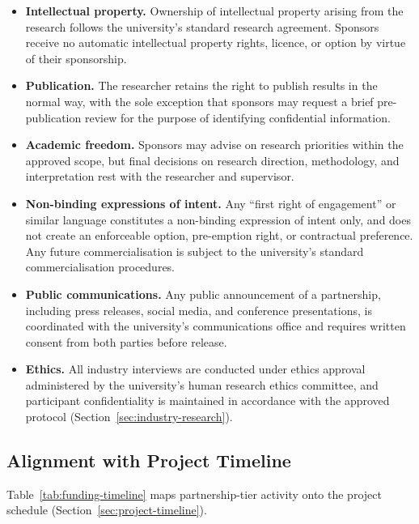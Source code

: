 \documentclass[12pt]{article}
\begin{document}
\begin{itemize}
    \item \textbf{Intellectual property.} Ownership of intellectual
    property arising from the research follows the university's
    standard research agreement. Sponsors receive no automatic
    intellectual property rights, licence, or option by virtue of
    their sponsorship.

    \item \textbf{Publication.} The researcher retains the right to
    publish results in the normal way, with the sole exception that
    sponsors may request a brief pre-publication review for the
    purpose of identifying confidential information.

    \item \textbf{Academic freedom.} Sponsors may advise on research
    priorities within the approved scope, but final decisions on
    research direction, methodology, and interpretation rest with the
    researcher and supervisor.

    \item \textbf{Non-binding expressions of intent.} Any ``first
    right of engagement'' or similar language constitutes a
    non-binding expression of intent only, and does not create an
    enforceable option, pre-emption right, or contractual preference.
    Any future commercialisation is subject to the university's
    standard commercialisation procedures.

    \item \textbf{Public communications.} Any public announcement of a
    partnership, including press releases, social media, and
    conference presentations, is coordinated with the university's
    communications office and requires written consent from both
    parties before release.

    \item \textbf{Ethics.} All industry interviews are conducted under
    ethics approval administered by the university's human research
    ethics committee, and participant confidentiality is maintained
    in accordance with the approved protocol
    (Section~\ref{sec:industry-research}).
\end{itemize}

\subsection{Alignment with Project Timeline}

Table~\ref{tab:funding-timeline} maps partnership-tier activity onto
the project schedule (Section~\ref{sec:project-timeline}).
\end{document}

